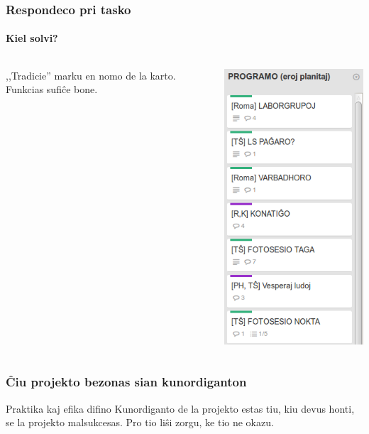   \begin{frame}
    \frametitle{Respondeco pri tasko}
    \framesubtitle{Kiel solvi?}

    \begin{columns}
    	
    ,,Tradicie'' marku en nomo de la karto. Funkcias sufiĉe bone.
    	
    
    \includegraphics[scale=0.35]{ekranoj/respondeco-pri-karto}
	
	\end{columns}
  \end{frame}


  \begin{frame}
    \frametitle{Ĉiu projekto bezonas sian kunordiganton}

	\begin{block}{Praktika kaj efika difino}
		Kunordiganto de la projekto estas tiu, kiu devus honti, se la projekto malsukcesas. Pro tio liŝi zorgu, ke tio ne okazu.
	\end{block}
	    
  \end{frame}
